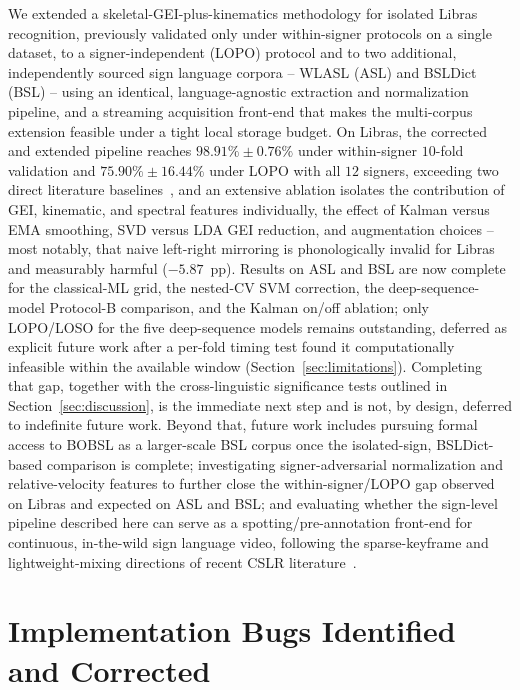 \documentclass[journal]{IEEEtran}
\begin{document}
We extended a skeletal-GEI-plus-kinematics methodology for isolated Libras recognition, previously validated only under within-signer protocols on a single dataset, to a signer-independent (LOPO) protocol and to two additional, independently sourced sign language corpora -- WLASL (ASL) and BSLDict (BSL) -- using an identical, language-agnostic extraction and normalization pipeline, and a streaming acquisition front-end that makes the multi-corpus extension feasible under a tight local storage budget. On Libras, the corrected and extended pipeline reaches $98.91\%\pm0.76\%$ under within-signer $10$-fold validation and $75.90\%\pm16.44\%$ under LOPO with all $12$ signers, exceeding two direct literature baselines~\cite{passos2021,rego2025}, and an extensive ablation isolates the contribution of GEI, kinematic, and spectral features individually, the effect of Kalman versus EMA smoothing, SVD versus LDA GEI reduction, and augmentation choices -- most notably, that naive left-right mirroring is phonologically invalid for Libras and measurably harmful ($-5.87$~pp). Results on ASL and BSL are now complete for the classical-ML grid, the nested-CV SVM correction, the deep-sequence-model Protocol-B comparison, and the Kalman on/off ablation; only LOPO/LOSO for the five deep-sequence models remains outstanding, deferred as explicit future work after a per-fold timing test found it computationally infeasible within the available window (Section~\ref{sec:limitations}). Completing that gap, together with the cross-linguistic significance tests outlined in Section~\ref{sec:discussion}, is the immediate next step and is not, by design, deferred to indefinite future work. Beyond that, future work includes pursuing formal access to BOBSL as a larger-scale BSL corpus once the isolated-sign, BSLDict-based comparison is complete; investigating signer-adversarial normalization and relative-velocity features to further close the within-signer/LOPO gap observed on Libras and expected on ASL and BSL; and evaluating whether the sign-level pipeline described here can serve as a spotting/pre-annotation front-end for continuous, in-the-wild sign language video, following the sparse-keyframe and lightweight-mixing directions of recent CSLR literature~\cite{jiang2026,ye2026,zhang2024}.

\appendices
\section{Implementation Bugs Identified and Corrected}
\label{app:bugs}
\end{document}

